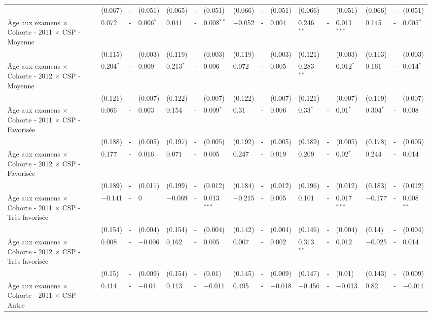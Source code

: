 \documentclass[
]{book}
\begin{document}
\begin{ThreePartTable}
\begin{longtable}[t]{llllllllllllllll}
 & (0.067) & - & (0.051) & (0.065) & - & (0.051) & (0.066) & - & (0.051) & (0.066) & - & (0.051) & (0.066) & - & (0.051)\\
Âge aux examens $\times$ Cohorte - 2011 $\times$ CSP - Moyenne & 0.072 & - & 0.006$^{*}$ & 0.041 & - & 0.008$^{**}$ & $-$0.052 & - & 0.004 & 0.246$^{**}$ & - & 0.011$^{***}$ & 0.145 & - & 0.005$^{*}$\\
 & (0.115) & - & (0.003) & (0.119) & - & (0.003) & (0.119) & - & (0.003) & (0.121) & - & (0.003) & (0.113) & - & (0.003)\\
Âge aux examens $\times$ Cohorte - 2012 $\times$ CSP - Moyenne & 0.204$^{*}$ & - & 0.009 & 0.213$^{*}$ & - & 0.006 & 0.072 & - & 0.005 & 0.283$^{**}$ & - & 0.012$^{*}$ & 0.161 & - & 0.014$^{*}$\\
 & (0.121) & - & (0.007) & (0.122) & - & (0.007) & (0.122) & - & (0.007) & (0.121) & - & (0.007) & (0.119) & - & (0.007)\\
Âge aux examens $\times$ Cohorte - 2011 $\times$ CSP - Favorisée & 0.066 & - & 0.003 & 0.154 & - & 0.009$^{*}$ & 0.31 & - & 0.006 & 0.33$^{*}$ & - & 0.01$^{*}$ & 0.304$^{*}$ & - & 0.008\\
 & (0.188) & - & (0.005) & (0.197) & - & (0.005) & (0.192) & - & (0.005) & (0.189) & - & (0.005) & (0.178) & - & (0.005)\\
Âge aux examens $\times$ Cohorte - 2012 $\times$ CSP - Favorisée & 0.177 & - & 0.016 & 0.071 & - & 0.005 & 0.247 & - & 0.019 & 0.209 & - & 0.02$^{*}$ & 0.244 & - & 0.014\\
 & (0.189) & - & (0.011) & (0.199) & - & (0.012) & (0.184) & - & (0.012) & (0.196) & - & (0.012) & (0.183) & - & (0.012)\\
Âge aux examens $\times$ Cohorte - 2011 $\times$ CSP - Très favorisée & $-$0.141 & - & 0 & $-$0.069 & - & 0.013$^{***}$ & $-$0.215 & - & 0.005 & 0.101 & - & 0.017$^{***}$ & $-$0.177 & - & 0.008$^{**}$\\
 & (0.154) & - & (0.004) & (0.154) & - & (0.004) & (0.142) & - & (0.004) & (0.146) & - & (0.004) & (0.14) & - & (0.004)\\
Âge aux examens $\times$ Cohorte - 2012 $\times$ CSP - Très favorisée & 0.008 & - & $-$0.006 & 0.162 & - & 0.005 & 0.007 & - & 0.002 & 0.313$^{**}$ & - & 0.012 & $-$0.025 & - & 0.014\\
 & (0.15) & - & (0.009) & (0.154) & - & (0.01) & (0.145) & - & (0.009) & (0.147) & - & (0.01) & (0.143) & - & (0.009)\\
Âge aux examens $\times$ Cohorte - 2011 $\times$ CSP - Autre & 0.414 & - & $-$0.01 & 0.113 & - & $-$0.011 & 0.495 & - & $-$0.018 & $-$0.456 & - & $-$0.013 & 0.82 & - & $-$0.014\\

\end{longtable}
\end{ThreePartTable}
\end{document}
